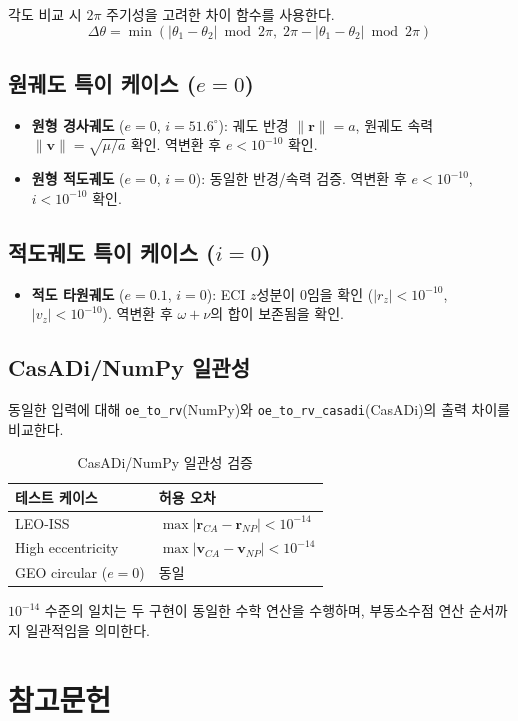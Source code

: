\documentclass[11pt]{article}
\begin{document}
각도 비교 시 $2\pi$ 주기성을 고려한 차이 함수를 사용한다.
\[
  \Delta\theta = \min\left(|\theta_1 - \theta_2| \bmod 2\pi, \; 2\pi - |\theta_1 - \theta_2| \bmod 2\pi\right)
\]

\subsection{원궤도 특이 케이스 ($e = 0$)}

\begin{itemize}
  \item \textbf{원형 경사궤도} ($e=0$, $i=51.6^\circ$): 궤도 반경 $\|\mathbf{r}\| = a$, 원궤도 속력 $\|\mathbf{v}\| = \sqrt{\mu/a}$ 확인. 역변환 후 $e < 10^{-10}$ 확인.
  \item \textbf{원형 적도궤도} ($e=0$, $i=0$): 동일한 반경/속력 검증. 역변환 후 $e < 10^{-10}$, $i < 10^{-10}$ 확인.
\end{itemize}

\subsection{적도궤도 특이 케이스 ($i = 0$)}

\begin{itemize}
  \item \textbf{적도 타원궤도} ($e=0.1$, $i=0$): ECI $z$성분이 0임을 확인 ($|r_z| < 10^{-10}$, $|v_z| < 10^{-10}$). 역변환 후 $\omega + \nu$의 합이 보존됨을 확인.
\end{itemize}

\subsection{CasADi/NumPy 일관성}

동일한 입력에 대해 \texttt{oe\_to\_rv}(NumPy)와 \texttt{oe\_to\_rv\_casadi}(CasADi)의 출력 차이를 비교한다.

\begin{table}[h]
\centering
\begin{tabular}{ll}
\toprule
테스트 케이스 & 허용 오차 \\
\midrule
LEO-ISS & $\max|\mathbf{r}_{CA} - \mathbf{r}_{NP}| < 10^{-14}$ \\
High eccentricity & $\max|\mathbf{v}_{CA} - \mathbf{v}_{NP}| < 10^{-14}$ \\
GEO circular ($e=0$) & 동일 \\
\bottomrule
\end{tabular}
\caption{CasADi/NumPy 일관성 검증}
\label{tab:casadi_consistency}
\end{table}

$10^{-14}$ 수준의 일치는 두 구현이 동일한 수학 연산을 수행하며, 부동소수점 연산 순서까지 일관적임을 의미한다.

\section{참고문헌}



\end{document}
